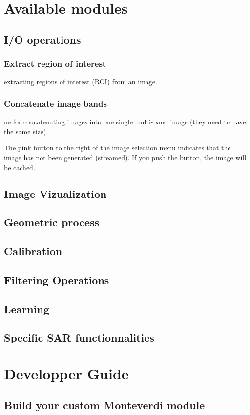 \documentclass{InsightSoftwareGuide}
\begin{document}
\section{Available modules}
\subsection{I/O operations}
\subsubsection{Extract region of interest}
extracting regions of interest (ROI) from an image.
\subsubsection{Concatenate image bands}
ne for concatenating images into one single multi-band image (they need to have the same size).

The pink button to the right of the image selection menu indicates that the image has not been generated (streamed). If you push the button, the image will be cached. 
\subsection{Image Vizualization}
\subsection{Geometric process}

\subsection{Calibration}
\subsection{Filtering Operations}
\subsection{Learning}
\subsection{Specific SAR functionnalities}


\section{Developper Guide}
\subsection{Build your custom Monteverdi module}
\end{document}
